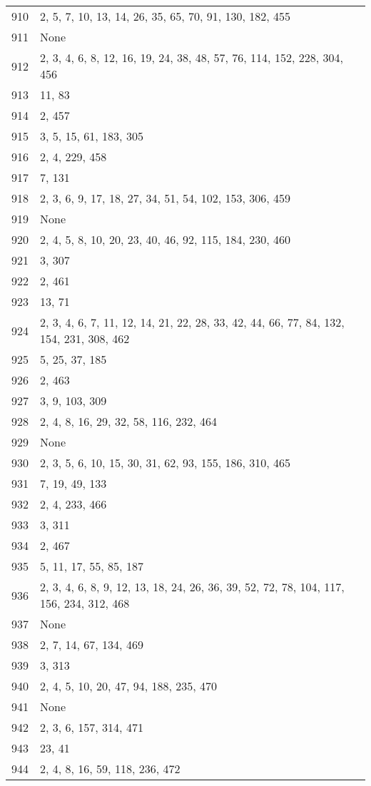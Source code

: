 \documentclass[12pt]{article}
\begin{document}
\begin{tabular}{|r|l|}
910 & 2, 5, 7, 10, 13, 14, 26, 35, 65, 70,  91, 130, 182, 455 \\ 
911 & None \\ 
912 & 2, 3, 4, 6, 8, 12, 16, 19, 24, 38, 48, 57, 76, 114, 152, 228, 304, 456 \\ 
913 & 11, 83 \\ 
914 & 2, 457 \\ 
915 & 3, 5, 15, 61, 183, 305 \\ 
916 & 2, 4, 229, 458 \\ 
917 & 7, 131 \\ 
918 & 2, 3, 6,  9, 17, 18, 27, 34, 51, 54, 102, 153, 306, 459 \\ 
919 & None \\ 
920 & 2, 4, 5,  8, 10, 20, 23, 40, 46, 92, 115, 184, 230, 460 \\ 
921 & 3, 307 \\ 
922 & 2, 461 \\ 
923 & 13, 71 \\ 
924 & 2, 3, 4, 6, 7, 11, 12, 14,  21, 22, 28, 33, 42, 44, 66, 77, 84, 132, 154, 231, 308, 462 \\ 
925 & 5, 25, 37, 185 \\ 
926 & 2, 463 \\ 
927 & 3, 9, 103, 309 \\ 
928 & 2, 4, 8, 16, 29, 32, 58, 116, 232,  464 \\ 
929 & None \\ 
930 & 2, 3, 5, 6, 10, 15, 30, 31, 62, 93, 155,  186, 310, 465 \\ 
931 & 7, 19, 49, 133 \\ 
932 & 2, 4, 233,  466 \\ 
933 & 3, 311 \\ 
934 & 2,  467 \\ 
935 & 5, 11, 17, 55, 85, 187 \\ 
936 & 2, 3, 4, 6, 8, 9, 12, 13, 18, 24, 26, 36, 39, 52, 72, 78, 104, 117, 156, 234, 312,  468 \\ 
937 & None \\ 
938 & 2, 7, 14, 67, 134, 469 \\ 
939 & 3, 313 \\ 
940 & 2, 4, 5, 10, 20, 47, 94, 188, 235,  470 \\ 
941 & None \\ 
942 & 2, 3, 6, 157, 314, 471 \\ 
943 & 23, 41 \\ 
944 & 2, 4, 8, 16, 59, 118, 236, 472 \\ 

\end{tabular}
\end{document}
